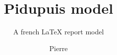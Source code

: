 
\usepackage[frenchb, english]{babel} %
\usepackage[utf8]{inputenc} %
\usepackage[T1]{fontenc} %

\usepackage[top=2.5cm, bottom=3cm, left=3.5cm, right=2.5cm]{geometry} %

\author{Pierre} %
\title{Pidupuis model} %
\subtitle{A french {\LaTeX} report model}

